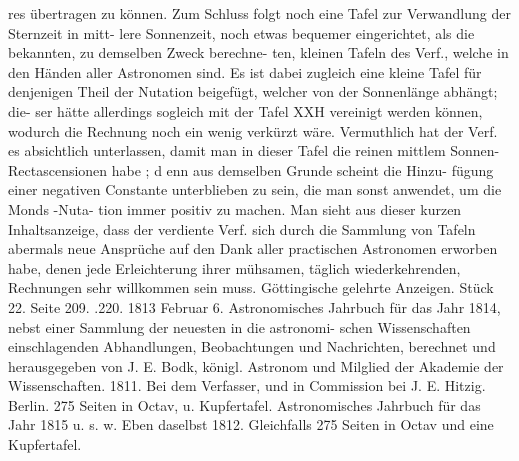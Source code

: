 \documentclass[12pt,a4paper]{article}
\begin{document}
res übertragen zu können. Zum Schluss folgt noch eine Tafel zur Verwandlung der Sternzeit in mitt-\newline
lere Sonnenzeit, noch etwas bequemer eingerichtet, als die bekannten, zu demselben Zweck berechne-\newline
ten, kleinen Tafeln des Verf., welche in den Händen aller Astronomen sind. Es ist dabei zugleich eine\newline
kleine Tafel für denjenigen Theil der Nutation beigefügt, welcher von der Sonnenlänge abhängt; die-\newline
ser hätte allerdings sogleich mit der Tafel XXH vereinigt werden können, wodurch die Rechnung noch\newline
ein wenig verkürzt wäre. Vermuthlich hat der Verf. es absichtlich unterlassen, damit man in dieser\newline
Tafel die reinen mittlem Sonnen-Rectascensionen habe ; d enn aus demselben Grunde scheint die Hinzu-\newline
fügung einer negativen Constante unterblieben zu sein, die man sonst anwendet, um die Monds -Nuta-\newline
tion immer positiv zu machen.\newline
Man sieht aus dieser kurzen Inhaltsanzeige, dass der verdiente Verf. sich durch die Sammlung\newline
von Tafeln abermals neue Ansprüche auf den Dank aller practischen Astronomen erworben habe, denen\newline
jede Erleichterung ihrer mühsamen, täglich wiederkehrenden, Rechnungen sehr willkommen sein muss.\newline
Göttingische gelehrte Anzeigen. Stück 22. Seite 209. .220. 1813 Februar 6.\newline
Astronomisches Jahrbuch für das Jahr 1814, nebst einer Sammlung der neuesten in die astronomi-\newline
schen Wissenschaften einschlagenden Abhandlungen, Beobachtungen und Nachrichten, berechnet und\newline
herausgegeben von J. E. Bodk, königl. Astronom und Milglied der Akademie der Wissenschaften. 1811.\newline
Bei dem Verfasser, und in Commission bei J. E. Hitzig. Berlin. 275 Seiten in Octav, u. Kupfertafel.\newline
Astronomisches Jahrbuch für das Jahr 1815 u. s. w. Eben daselbst 1812. Gleichfalls 275 Seiten in\newline
Octav und eine Kupfertafel.\newline
\end{document}
